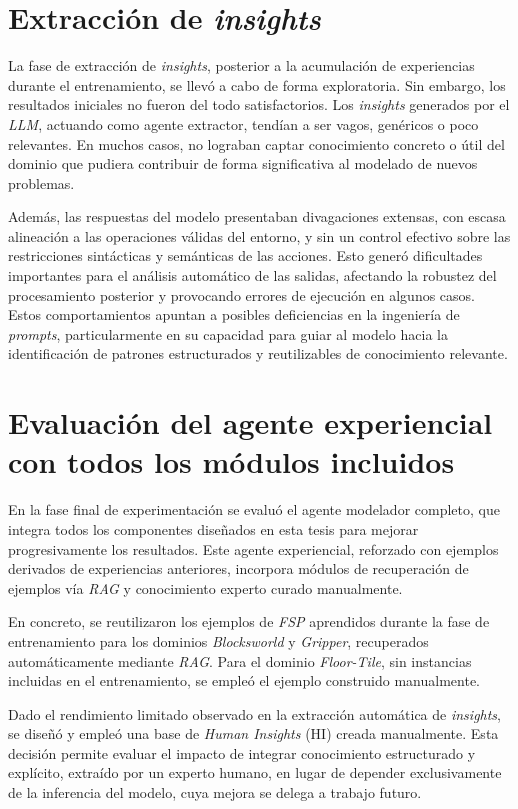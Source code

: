 \section{Extracción de \textit{insights}}

La fase de extracción de \textit{insights}, posterior a la acumulación de experiencias durante el entrenamiento, se llevó a cabo de forma exploratoria. Sin embargo, los resultados iniciales no fueron del todo satisfactorios. Los \textit{insights} generados por el \textit{LLM}, actuando como agente extractor, tendían a ser vagos, genéricos o poco relevantes. En muchos casos, no lograban captar conocimiento concreto o útil del dominio que pudiera contribuir de forma significativa al modelado de nuevos problemas.

Además, las respuestas del modelo presentaban divagaciones extensas, con escasa alineación a las operaciones válidas del entorno, y sin un control efectivo sobre las restricciones sintácticas y semánticas de las acciones. Esto generó dificultades importantes para el análisis automático de las salidas, afectando la robustez del procesamiento posterior y provocando errores de ejecución en algunos casos. Estos comportamientos apuntan a posibles deficiencias en la ingeniería de \textit{prompts}, particularmente en su capacidad para guiar al modelo hacia la identificación de patrones estructurados y reutilizables de conocimiento relevante.

\section{Evaluación del agente experiencial con todos los módulos incluidos}

En la fase final de experimentación se evaluó el agente modelador completo, que integra todos los componentes diseñados en esta tesis para mejorar progresivamente los resultados. Este agente experiencial, reforzado con ejemplos derivados de experiencias anteriores, incorpora módulos de recuperación de ejemplos vía \textit{RAG} y conocimiento experto curado manualmente.

En concreto, se reutilizaron los ejemplos de \textit{FSP} aprendidos durante la fase de entrenamiento para los dominios \textit{Blocksworld} y \textit{Gripper}, recuperados automáticamente mediante \textit{RAG}. Para el dominio \textit{Floor-Tile}, sin instancias incluidas en el entrenamiento, se empleó el ejemplo construido manualmente.

Dado el rendimiento limitado observado en la extracción automática de \textit{insights}, se diseñó y empleó una base de \textit{Human Insights} (HI) creada manualmente. Esta decisión permite evaluar el impacto de integrar conocimiento estructurado y explícito, extraído por un experto humano, en lugar de depender exclusivamente de la inferencia del modelo, cuya mejora se delega a trabajo futuro.

